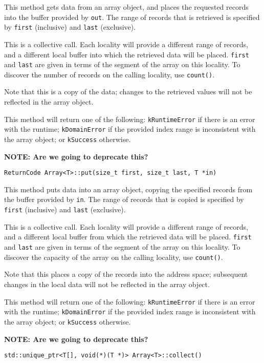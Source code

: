 \noindent This method gets data from an array object, and places the requested
records into the buffer provided by \texttt{out}. The range of records that is
retrieved is specified by \texttt{first} (inclusive) and \texttt{last}
(exclusive).

This is a collective call. Each locality will provide a different range of
records, and a different local buffer into which the retrieved data will be
placed. \texttt{first} and \texttt{last} are given in terms of the segment of
the array on this locality. To discover the number of records on the calling
locality, use \texttt{count()}.

Note that this is a copy of the data; changes to the retrieved values
will not be reflected in the array object.

This method will return one of the following: \texttt{kRuntimeError} if there
is an error with the runtime; \texttt{kDomainError} if the provided index range
is inconsistent with the array object; or \texttt{kSuccess} otherwise.

{\bf NOTE: Are we going to deprecate this?}

\begin{lstlisting}
ReturnCode Array<T>::put(size_t first, size_t last, T *in)
\end{lstlisting}

\noindent This method puts data into an array object, copying the specified
records from the buffer provided by \texttt{in}. The range of records that is
copied is specified by \texttt{first} (inclusive) and \texttt{last} (exclusive).

This is a collective call. Each locality will provide a different range of
records, and a different local buffer from which the retrieved data will be
placed. \texttt{first} and \texttt{last} are given in terms of the segment of
the array on this locality. To discover the capacity of the array on the
calling locality, use \texttt{count()}.

Note that this places a copy of the records into the address space;
subsequent changes in the local data will not be reflected in the array object.

This method will return one of the following: \texttt{kRuntimeError} if there
is an error with the runtime; \texttt{kDomainError} if the provided index
range is inconsistent with the array object; or \texttt{kSuccess} otherwise.

{\bf NOTE: Are we going to deprecate this?}

\begin{lstlisting}
std::unique_ptr<T[], void(*)(T *)> Array<T>::collect()
\end{lstlisting}

